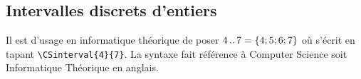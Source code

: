 \documentclass[12pt,a4paper]{article}
\begin{document}

\subsection{Intervalles discrets d'entiers}

Il est d'usage en informatique théorique de poser $4\,.\mkern0.2mu.\,7 = \{ 4 ; 5 ; 6 ; 7 \}$ où  s'écrit en tapant \verb+\CSinterval{4}{7}+. La syntaxe fait référence à \og Computer Science \fg{} soit \og Informatique Théorique \fg{} en anglais.
\end{document}
